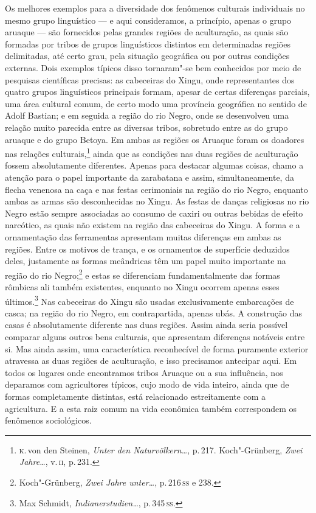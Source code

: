 Os melhores exemplos para a diversidade dos fenômenos culturais
individuais no mesmo grupo linguístico --- e aqui consideramos, a
princípio, apenas o grupo aruaque --- são fornecidos pelas grandes
regiões de aculturação, as quais são formadas por tribos de grupos
linguísticos distintos em determinadas regiões delimitadas, até certo
grau, pela situação geográfica ou por outras condições externas. Dois
exemplos típicos disso tornaram"-se bem conhecidos por meio de pesquisas
científicas precisas: as cabeceiras do Xingu, onde representantes dos
quatro grupos linguísticos principais formam, apesar de certas
diferenças parciais, uma área cultural comum, de certo modo uma
província geográfica no sentido de Adolf Bastian; e em seguida a
região do rio Negro, onde se desenvolveu uma relação muito parecida
entre as diversas tribos, sobretudo entre as do grupo aruaque e do grupo
Betoya. Em ambas as regiões os Aruaque foram os doadores nas relações
culturais,\footnote{\textsc{k}.\,von den Steinen, \textit{Unter den Naturvölkern\ldots}, p.\,217. Koch"-Grünberg, \textit{Zwei Jahre\ldots}, v.\,\textsc{ii}, p.\,231.} ainda que as condições
nas duas regiões de aculturação fossem absolutamente diferentes.
Apenas para destacar algumas coisas, chamo a atenção para o papel
importante da zarabatana e assim, simultaneamente, da flecha venenosa na
caça e nas festas cerimoniais na região do rio Negro, enquanto ambas as
armas são desconhecidas no Xingu. As festas de danças religiosas no rio
Negro estão sempre associadas ao consumo de caxiri ou outras bebidas de
efeito narcótico, as quais não existem na região das cabeceiras do
Xingu. A forma e a ornamentação das ferramentas apresentam muitas
diferenças em ambas as regiões. Entre os motivos de trança, e os
ornamentos de superfície deduzidos deles, justamente as formas
meândricas têm um papel muito importante na região do rio
Negro;\footnote{Koch"-Grünberg, \textit{Zwei Jahre unter\ldots}, 
p.\,216\,\textsc{ss} e 238.} e estas se diferenciam fundamentalmente das
formas rômbicas ali também existentes, enquanto no Xingu ocorrem apenas
esses últimos.\footnote{Max Schmidt, \textit{Indianerstudien\ldots}, p.\,345\,\textsc{ss}.} Nas cabeceiras do Xingu são
usadas exclusivamente embarcações de casca; na região do rio Negro, em
contrapartida, apenas ubás. A construção das casas é absolutamente
diferente nas duas regiões. Assim ainda seria possível comparar alguns
outros bens culturais, que apresentam diferenças notáveis entre si. Mas
ainda assim, uma característica reconhecível de forma puramente exterior
atravessa as duas regiões de aculturação, e isso precisamos antecipar
aqui. Em todos os lugares onde encontramos tribos Aruaque ou a sua
influência, nos deparamos com agricultores típicos, cujo modo de vida
inteiro, ainda que de formas completamente distintas, está relacionado
estreitamente com a agricultura. E a esta raiz comum na vida econômica
também correspondem os fenômenos sociológicos.

